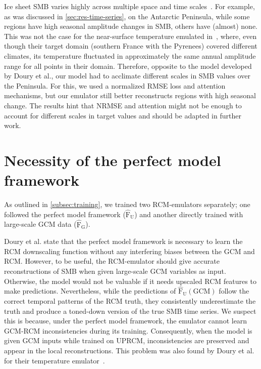 \documentclass[a4paper,11pt,oneside]{report}
\begin{document}
Ice sheet SMB varies highly across multiple space and time scales~\cite{Lenaerts2019}. For example, as was discussed in \autoref{sec:res-time-series}, on the Antarctic Peninsula, while some regions have high seasonal amplitude changes in SMB, others have (almost) none. This was not the case for the near-surface temperature emulated in~\cite{Doury}, where, even though their target domain (southern France with the Pyrenees) covered different climates, its temperature fluctuated in approximately the same annual amplitude range for all points in their domain. Therefore, opposite to the model developed by Doury et al., our model had to acclimate different scales in SMB values over the Peninsula. For this, we used a normalized RMSE loss and attention mechanisms, but our emulator still better reconstructs regions with high seasonal change. The results hint that NRMSE and attention might not be enough to account for different scales in target values and should be adapted in further work. 


\section{Necessity of the perfect model framework}\label{sec:disc-perfect-model}

As outlined in \autoref{subsec:training}, we trained two RCM-emulators separately; one followed the perfect model framework ($\mathrm{\hat{F}_{U}}$) and another directly trained with large-scale GCM data ($\mathrm{\hat{F}_{G}}$). 


Doury et al. state that the perfect model framework is necessary to learn the RCM downscaling function without any interfering biases between the GCM and RCM. However, to be useful, the RCM-emulator should give accurate reconstructions of SMB when given large-scale GCM variables as input. Otherwise, the model would not be valuable if it needs upscaled RCM features to make predictions. Nevertheless, while the predictions of $\mathrm{\hat{F}_{U}(GCM)}$ follow the correct temporal patterns of the RCM truth, they consistently underestimate the truth and produce a toned-down version of the true SMB time series. We suspect this is because, under the perfect model framework, the emulator cannot learn GCM-RCM inconsistencies during its training. Consequently, when the model is given GCM inputs while trained on UPRCM, inconsistencies are preserved and appear in the local reconstructions. This problem was also found by Doury et al. for their temperature emulator~\cite{Doury}. 
\end{document}
